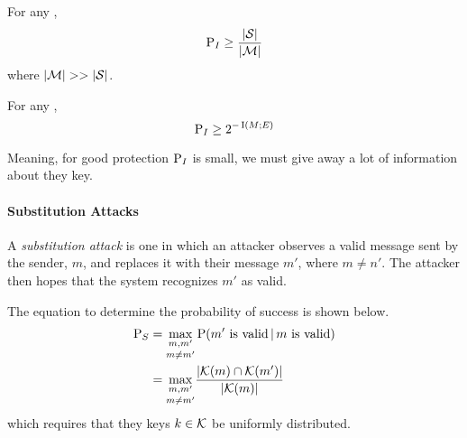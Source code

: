 \begin{theorem}\label{thm:Attack_Authentication_Code-Impersonation-Success_Bounds}
  For any ,
  \begin{equation}\label{eq:Attack_Authentication_Code-Impersonation-Success_Bound}
    \operatorname{\operatorname{P}}_{I} \geq \frac{\lvert \operatorname{\mathcal{S}} \rvert}{\lvert \operatorname{\mathcal{M}} \rvert}
  \end{equation}
  where $\lvert \operatorname{\mathcal{M}} \rvert >> \lvert \operatorname{\mathcal{S}} \rvert$.
\end{theorem}

\begin{theorem}\label{thm:Impersonation-Simmons_Bound}
  For any ,
  \begin{equation}\label{eq:Impersonation-Simmons_Bound}
    \operatorname{\operatorname{P}}_{I} \geq 2^{-\operatorname{\operatorname{I}}(M; E)}
  \end{equation}

  Meaning, for good protection $\operatorname{\operatorname{P}}_{I}$ is small, we must give away a lot of information about they key.
\end{theorem}

\paragraph{Substitution Attacks}\label{par:Attack_Authentication_Code-Substitution}
\begin{definition}\label{def:Attack_Authentication_Code-Substitution}
  A \emph{substitution attack} is one in which an attacker observes a valid message sent by the sender, $m$, and replaces it with their message $m'$, where $m \neq n'$.
  The attacker then hopes that the system recognizes $m'$ as valid.

  The equation to determine the probability of success is shown below.
  \begin{equation}\label{eq:Attack_Authentication_Code-Substitution-Success}
    \begin{aligned}
      \operatorname{\operatorname{P}}_{S} &= \underset{m \neq m'}{\max_{m,m'}} \operatorname{\operatorname{P}}(m' \text{ is valid} \operatorname{\vert} m \text{ is valid}) \\
      &= \underset{m \neq m'}{\max_{m,m'}} \frac{\lvert \operatorname{\mathcal{K}}(m) \cap \operatorname{\mathcal{K}}(m') \rvert}{\lvert \operatorname{\mathcal{K}}(m) \rvert}
    \end{aligned}
  \end{equation}
  which requires that they keys $k \in \operatorname{\mathcal{K}}$ be uniformly distributed.
\end{definition}

